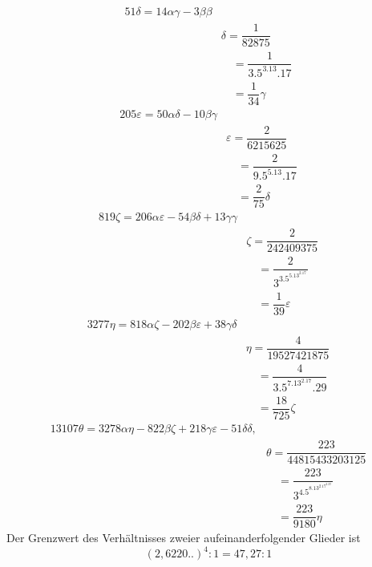 \[
\begin{aligned}51\delta=14\alpha\gamma-3\beta\beta\\[5pt]&\delta=\dfrac1{82875}\\[5pt]&\quad=\dfrac1{3.5^3.13.17}\\[5pt]&\quad=\dfrac1{34}\gamma\end{aligned}
\]
\[
\begin{aligned}205\varepsilon=50\alpha\delta-10\beta\gamma\\[5pt]&\varepsilon=\dfrac2{6215625}\\[5pt]&\quad=\dfrac2{9.5^5.13.17}\\[5pt]&\quad=\dfrac2{75}\delta\end{aligned}
\]
\[
\begin{aligned}819\zeta=206\alpha\varepsilon-54\beta\delta+13\gamma\gamma\\[5pt]&\zeta=\dfrac2{242409375}\\[5pt]&\quad=\dfrac2{3^3.5^5.13^2.17}\\[5pt]&\quad=\dfrac1{39}\varepsilon\end{aligned}
\]
\[
\begin{aligned}3277\eta=818\alpha\zeta-202\beta\varepsilon+38\gamma\delta\\[5pt]&\eta=\dfrac4{19527421875}\\[5pt]&\quad=\dfrac4{3.5^7.13^2.17.29}\\[5pt]&\quad=\dfrac{18}{725}\zeta\end{aligned}
\]
\[
\begin{aligned}13107\theta=3278\alpha\eta-822\beta\zeta+218\gamma\varepsilon-51\delta\delta,\\[5pt]&\theta=\dfrac{223}{44815433203125}\\[5pt]&\quad=\dfrac{223}{3^4.5^8.13^2.17^2.29}\\[5pt]&\quad=\dfrac{223}{9180}\eta\end{aligned}
\]
Der Grenzwert des Verhältnisses zweier aufeinanderfolgender Glieder ist
\[
(2{,}6220\mathord{.}\mathord{.})^4:1=47{,}27:1
\]


